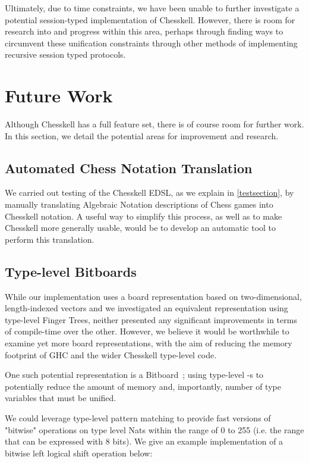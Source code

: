 Ultimately, due to time constraints, we have been unable to further investigate a potential session-typed implementation of Chesskell. However, there is room for research into and progress within this area, perhaps through finding ways to circumvent these unification constraints through other methods of implementing recursive session typed protocols.



\section{Future Work}

Although Chesskell has a full feature set, there is of course room for further work. In this section, we detail the potential areas for improvement and research.

\subsection{Automated Chess Notation Translation}

We carried out testing of the Chesskell EDSL, as we explain in \cref{testsection}, by manually translating Algebraic Notation descriptions of Chess games into Chesskell notation. A useful way to simplify this process, as well as to make Chesskell more generally usable, would be to develop an automatic tool to perform this translation.


\subsection{Type-level Bitboards} \label{bitboardconclusion}

While our implementation uses a board representation based on two-dimensional, length-indexed vectors and we investigated an equivalent representation using type-level Finger Trees, neither presented any significant improvements in terms of compile-time over the other. However, we believe it would be worthwhile to examine yet more board representations, with the aim of reducing the memory footprint of GHC and the wider Chesskell type-level code.

One such potential representation is a Bitboard~\cite{bitboard}; using type-level -s to potentially reduce the amount of memory and, importantly, number of type variables that must be unified.

We could leverage type-level pattern matching to provide fast versions of "bitwise" operations on type level Nats within the range of 0 to 255 (i.e. the range that can be expressed with 8 bits). We give an example implementation of a bitwise left logical shift operation below:

